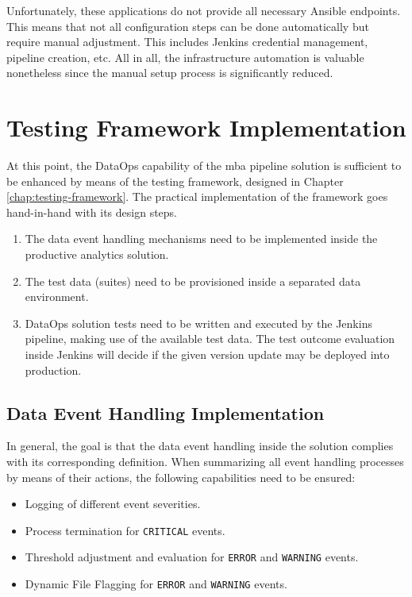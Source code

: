Unfortunately, these applications do not provide all necessary Ansible endpoints. This means that not all configuration steps can be done automatically but require manual adjustment. This includes Jenkins credential management, pipeline creation, etc. All in all, the infrastructure automation is valuable nonetheless since the manual setup process is significantly reduced.

\section{Testing Framework Implementation} \label{sec:5-testing-implementation}
At this point, the DataOps capability of the \ac{mba} pipeline solution is sufficient to be enhanced by means of the testing framework, designed in Chapter \ref{chap:testing-framework}. The practical implementation of the framework goes hand-in-hand with its design steps.
\begin{enumerate}
	\item The data event handling mechanisms need to be implemented inside the productive analytics solution.
	\item The test data (suites) need to be provisioned inside a separated data environment.
	\item DataOps solution tests need to be written and executed by the Jenkins pipeline, making use of the available test data. The test outcome evaluation inside Jenkins will decide if the given version update may be deployed into production.
\end{enumerate}

\subsection{Data Event Handling Implementation}
In general, the goal is that the data event handling inside the solution complies with its corresponding definition. When summarizing all event handling processes by means of their actions, the following capabilities need to be ensured:

\begin{itemize}
	\item Logging of different event severities.
	\item Process termination for \texttt{CRITICAL} events.
	\item Threshold adjustment and evaluation for \texttt{ERROR} and \texttt{WARNING} events.
	\item Dynamic File Flagging for \texttt{ERROR} and \texttt{WARNING} events.
\end{itemize}

